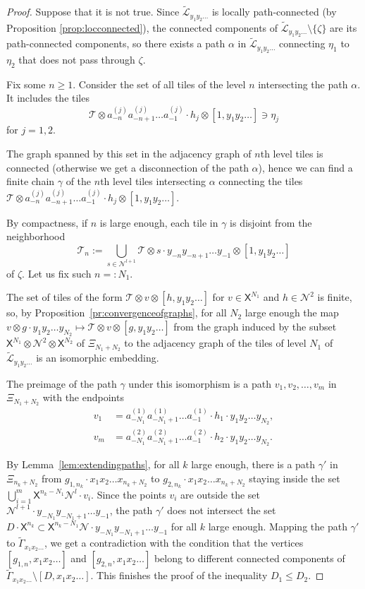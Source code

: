 \documentclass[11pt]{amsart}
\newcommand{\til}{\mathcal{T}}
\newcommand{\leaf}{\mathcal{L}}
\newcommand{\leaftilde}{\widetilde{\leaf}}
\newcommand{\alb}{\ensuremath{\mathsf{X}}}%
\newcommand{\nuke}{\ensuremath{\mathcal{N}}}%
\newcommand{\Gammatilde}{\ensuremath{\widetilde{\Gamma}}}%
\theoremstyle{definition}
\theoremstyle{plain}
\newtheorem{main thm}{Theorem}
\theoremstyle{remark}
\theoremstyle{plain}
\begin{document}
\begin{proof}
Suppose that it is not true. Since $\leaftilde_{y_1y_2\ldots}$ is locally path-connected (by Proposition \ref{prop:locconnected}), the connected components of $\leaftilde_{y_1y_2\ldots}\setminus\{\zeta\}$ are its path-connected components, so there exists a path $\alpha$ in $\leaftilde_{y_1y_2\ldots}$ connecting $\eta_1$ to $\eta_2$ that does not pass through $\zeta$. 

Fix some $n\ge 1$. Consider the set of all tiles of the level $n$ intersecting the path $\alpha$. It includes the tiles 
\[
\til\otimes a_{-n}^{(j)}a_{-n+1}^{(j)}\ldots a_{-1}^{(j)}\cdot h_j\otimes [1, y_1y_2\ldots]\ni\eta_j
\]
for $j=1, 2$.

The graph spanned by this set in the adjacency graph of $n$th level tiles is connected (otherwise we get a disconnection of the path $\alpha$), hence we can find a finite chain $\gamma$ of the $n$th level tiles intersecting $\alpha$ connecting the tiles  $\til\otimes a_{-n}^{(j)}a_{-n+1}^{(j)}\ldots a_{-1}^{(j)}\cdot h_j\otimes [1, y_1y_2\ldots]$.

  By compactness, if $n$ is large enough, each tile in $\gamma$ is disjoint from the neighborhood 
  \[\til_n:=\bigcup_{s\in \nuke^{l+1}}\til\otimes s\cdot y_{-n}y_{-n+1}\ldots y_{-1}\otimes [1, y_1y_2\ldots]\] of $\zeta$. Let us fix such $n=:N_1$. 

The set of tiles of the form $\til\otimes v\otimes [h, y_1y_2\ldots]$ for $v\in\alb^{N_1}$ and $h\in\nuke^2$ is finite, so, by Proposition~\ref{pr:convergenceofgraphs}, for all $N_2$ large enough the map $v\otimes g\cdot y_1y_2\ldots y_{N_2}\mapsto \til\otimes v\otimes [g, y_1y_2\ldots]$ from the graph induced by  the subset
$\alb^{N_1}\otimes \nuke^2\otimes \alb^{N_2}$ of $\Xi_{N_1+N_2}$ to the adjacency graph of the tiles of level $N_1$ of $\leaftilde_{y_1y_2\ldots}$ is an isomorphic embedding.

 

The preimage of the path $\gamma$ under this isomorphism is a path $v_1, v_2, \ldots, v_m$ in $\Xi_{N_1+N_2}$ with the endpoints 
\begin{align*}
v_1 &=a_{-N_1}^{(1)}a_{-N_1+1}^{(1)}\ldots a_{-1}^{(1)}\cdot h_1\cdot y_1y_2\ldots y_{N_2},\\
v_m &=a_{-N_1}^{(2)}a_{-N_1+1}^{(2)}\ldots a_{-1}^{(2)}\cdot h_2\cdot y_1y_2\ldots y_{N_2}.
\end{align*}

By Lemma~\ref{lem:extendingpaths}, for all $k$ large enough, there is a path $\gamma'$ in $\Xi_{n_k+N_2}$ from $g_{1, n_k}\cdot x_1x_2\ldots x_{n_k+N_2}$ to $g_{2, n_k}\cdot x_1x_2\ldots x_{n_k+N_2}$ staying inside the set $\bigcup_{i=1}^m\alb^{n_k-N_1}\nuke^l\cdot v_i$. Since the points $v_i$ are outside the set $\nuke^{l+1}\cdot y_{-N_1}y_{-N_1+1}\ldots y_{-1}$, the path $\gamma'$ does not intersect the set $D\cdot \alb^{n_k}\subset\alb^{n_k-N_1}\nuke\cdot y_{-N_1}y_{-N_1+1}\ldots y_{-1}$ for all $k$ large enough. Mapping the path $\gamma'$ to $\Gammatilde_{x_1x_2\ldots}$, we get a contradiction with the condition that the vertices $[g_{1, n}, x_1x_2\ldots]$ and $[g_{2, n}, x_1x_2\ldots]$ belong to different connected components of $\Gammatilde_{x_1x_2\ldots}\setminus [D, x_1x_2\ldots]$. This finishes the proof of the inequality $D_1\le D_2$.


\end{proof}
\end{document}
